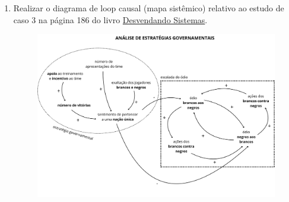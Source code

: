 \documentclass[11pt]{article}
\begin{document}
\begin{enumerate}
    \item Realizar o diagrama de loop causal (mapa sistêmico) relativo ao estudo de caso 3 na página 186 do livro \href{https://drive.google.com/file/d/1eJU2qK8IzC-S8jRKQuHrIgED1tEvzGOq/view}{Desvendando Sistemas}.
		\begin{figure}[!ht]
			\centering
			\includegraphics[width=0.83\linewidth]{mapa2-1.png}
		\end{figure}

\end{enumerate}
\end{document}
